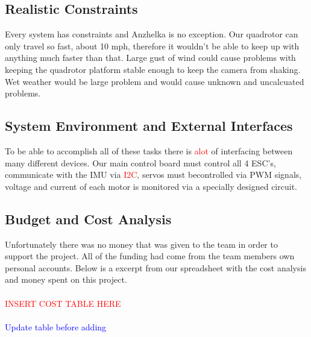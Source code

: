 \documentclass{article}
\numberwithin{equation}{section} %
\begin{document}
\subsection{Realistic Constraints}
Every system has constraints and Anzhelka is no exception. Our quadrotor can only travel so fast, about 10 mph, therefore it wouldn't be able to keep up with anything much faster than that. Large gust of wind could cause problems with keeping the quadrotor platform stable enough to keep the camera from shaking. Wet weather would be large problem and would cause unknown and uncalcuated problems.

\subsection{System Environment and External Interfaces}
To be able to accomplish all of these tasks there is \textcolor{red}{alot} of interfacing between many different devices. Our main control board must control all 4 ESC's, communicate with the IMU via \textcolor{red}{I2C}, servos must becontrolled via PWM signals, voltage and current of each motor is monitored via a specially designed circuit.

\subsection{Budget and Cost Analysis}
Unfortunately there was no money that was given to the team in order to support the project. All of the funding had come from the team members own personal accounts. Below is a excerpt from our spreadsheet with the cost analysis and money spent on this project.\\ \\
\textcolor{red}{INSERT COST TABLE HERE}\\ \\
\textcolor{blue}{Update table before adding}

\end{document}
